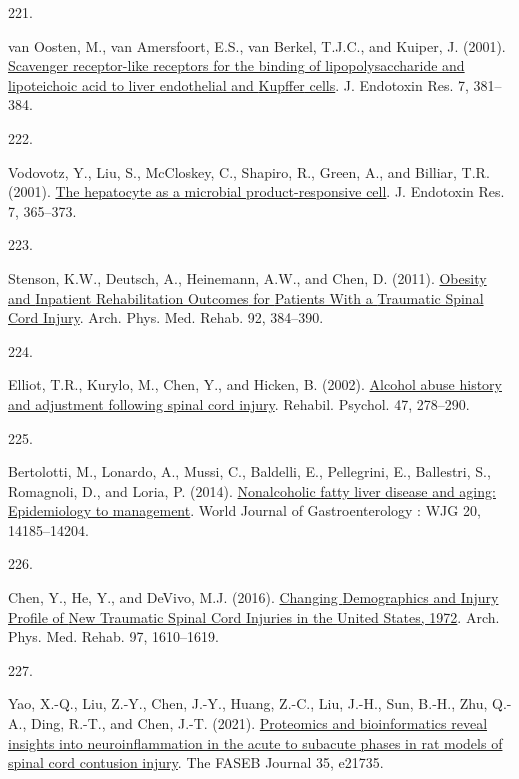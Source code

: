 \documentclass[
]{article}
\newlength{\cslhangindent}
\newlength{\csllabelwidth}
\newlength{\cslentryspacingunit} %
\newenvironment{CSLReferences}[2] %
 {%
  \setlength{\parindent}{0pt}
  \ifodd #1
  \let\oldpar\par
  \def\par{\hangindent=\cslhangindent\oldpar}
  \fi
  \setlength{\parskip}{#2\cslentryspacingunit}
 }%
 {}
\newcommand{\CSLLeftMargin}[1]{\parbox[t]{\csllabelwidth}{#1}}
\newcommand{\CSLRightInline}[1]{\parbox[t]{\linewidth - \csllabelwidth}{#1}\break}
\begin{document}
\begin{CSLReferences}{0}{0}
\leavevmode{}%
\CSLLeftMargin{221. }
\CSLRightInline{van Oosten, M., van Amersfoort, E.S., van Berkel, T.J.C., and Kuiper, J. (2001). \href{https://doi.org/10.1177/09680519010070050601}{Scavenger receptor-like receptors for the binding of lipopolysaccharide and lipoteichoic acid to liver endothelial and {Kupffer} cells}. J. Endotoxin Res. 7, 381--384.}

\leavevmode{}%
\CSLLeftMargin{222. }
\CSLRightInline{Vodovotz, Y., Liu, S., McCloskey, C., Shapiro, R., Green, A., and Billiar, T.R. (2001). \href{https://doi.org/10.1177/09680519010070050401}{The hepatocyte as a microbial product-responsive cell}. J. Endotoxin Res. 7, 365--373.}

\leavevmode{}%
\CSLLeftMargin{223. }
\CSLRightInline{Stenson, K.W., Deutsch, A., Heinemann, A.W., and Chen, D. (2011). \href{https://doi.org/10.1016/j.apmr.2010.07.235}{Obesity and {Inpatient Rehabilitation Outcomes} for {Patients With} a {Traumatic Spinal Cord Injury}}. Arch. Phys. Med. Rehab. 92, 384--390.}

\leavevmode{}%
\CSLLeftMargin{224. }
\CSLRightInline{Elliot, T.R., Kurylo, M., Chen, Y., and Hicken, B. (2002). \href{https://doi.org/10.1037/0090-5550.47.3.278}{Alcohol abuse history and adjustment following spinal cord injury}. Rehabil. Psychol. 47, 278--290.}

\leavevmode{}%
\CSLLeftMargin{225. }
\CSLRightInline{Bertolotti, M., Lonardo, A., Mussi, C., Baldelli, E., Pellegrini, E., Ballestri, S., Romagnoli, D., and Loria, P. (2014). \href{https://doi.org/10.3748/wjg.v20.i39.14185}{Nonalcoholic fatty liver disease and aging: {Epidemiology} to management}. World Journal of Gastroenterology : WJG 20, 14185--14204.}

\leavevmode{}%
\CSLLeftMargin{226. }
\CSLRightInline{Chen, Y., He, Y., and DeVivo, M.J. (2016). \href{https://doi.org/10.1016/j.apmr.2016.03.017}{Changing {Demographics} and {Injury Profile} of {New Traumatic Spinal Cord Injuries} in the {United States}, 1972\textendash 2014}. Arch. Phys. Med. Rehab. 97, 1610--1619.}

\leavevmode{}%
\CSLLeftMargin{227. }
\CSLRightInline{Yao, X.-Q., Liu, Z.-Y., Chen, J.-Y., Huang, Z.-C., Liu, J.-H., Sun, B.-H., Zhu, Q.-A., Ding, R.-T., and Chen, J.-T. (2021). \href{https://doi.org/10.1096/fj.202100081RR}{Proteomics and bioinformatics reveal insights into neuroinflammation in the acute to subacute phases in rat models of spinal cord contusion injury}. The FASEB Journal 35, e21735.}


\end{CSLReferences}
\end{document}
